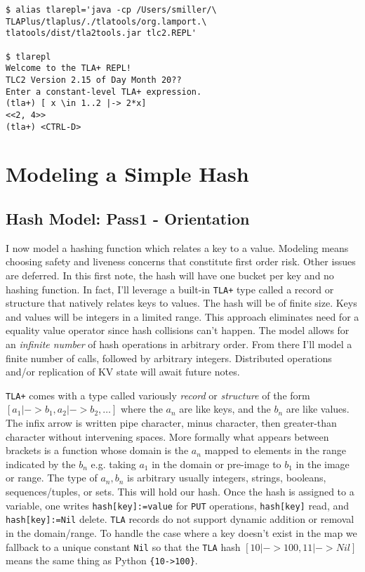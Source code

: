 \documentclass[twocolumn]{article}
\begin{document}
\begin{verbatim}
$ alias tlarepl='java -cp /Users/smiller/\
TLAPlus/tlaplus/./tlatools/org.lamport.\
tlatools/dist/tla2tools.jar tlc2.REPL'

$ tlarepl
Welcome to the TLA+ REPL!
TLC2 Version 2.15 of Day Month 20??
Enter a constant-level TLA+ expression.
(tla+) [ x \in 1..2 |-> 2*x]
<<2, 4>>
(tla+) <CTRL-D>
\end{verbatim}

\section{Modeling a Simple Hash}

\subsection{Hash Model: Pass1 - Orientation}
I now model a hashing function which relates a key to a value. Modeling means choosing safety and liveness concerns that constitute first order risk. Other issues are deferred. In this first note, the hash will have one bucket per key and no hashing function. In fact, I'll leverage a built-in \texttt{TLA+} type called a record or structure that natively relates keys to values. The hash will be of finite size. Keys and values will be integers in a limited range. This approach eliminates need for a equality value operator since hash collisions can't happen. The model allows for an \emph{infinite number} of hash operations in arbitrary order. From there I'll model a finite number of calls, followed by arbitrary integers. Distributed operations and/or replication of KV state will await future notes.

\texttt{TLA+} comes with a type called variously \emph{record} or \emph{structure} of the form $[a_1 | -> b_1, a_2 | -> b_2, \ldots]$ where the $a_n$ are like keys, and the $b_n$ are like values. The infix arrow is written pipe character, minus character, then greater-than character without intervening spaces. More formally what appears between brackets is a function whose domain is the $a_n$ mapped to elements in the range indicated by the $b_n$ e.g. taking $a_1$ in the domain or pre-image to $b_1$ in the image or range. The type of $a_n, b_n$ is arbitrary usually integers, strings, booleans, sequences/tuples, or sets. This will hold our hash. Once the hash is assigned to a variable, one writes \texttt{hash[key]:=value} for \texttt{PUT} operations, \texttt{hash[key]} read, and \texttt{hash[key]:=Nil} delete. \texttt{TLA} records do not support dynamic addition or removal in the domain/range. To handle the case where a key doesn't exist in the map we fallback to a unique constant \texttt{Nil} so that the \texttt{TLA} hash $[10 | -> 100, 11 | -> Nil]$ means the same thing as Python \texttt{\{10->100\}}.
 
\end{document}

